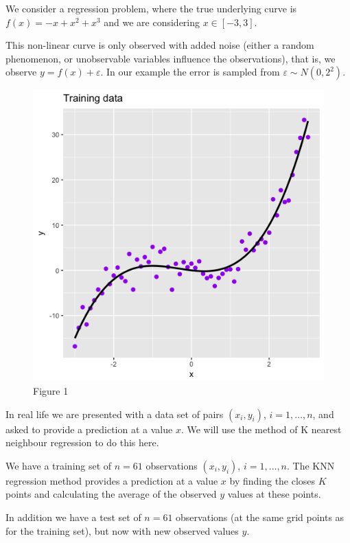 \documentclass[]{article}
\begin{document}
We consider a regression problem, where the true underlying curve is
\(f(x)=-x+x^2+x^3\) and we are considering \(x \in [-3,3]\).

This non-linear curve is only observed with added noise (either a random
phenomenon, or unobservable variables influence the observations), that
is, we observe \(y=f(x)+\varepsilon\). In our example the error is
sampled from \(\varepsilon\sim N(0,2^2)\).

\begin{figure}
\centering
\includegraphics{Prob1f1.png}
\caption{Figure 1}
\end{figure}

In real life we are presented with a data set of pairs \((x_i,y_i)\),
\(i=1,\ldots,n\), and asked to provide a prediction at a value \(x\). We
will use the method of K nearest neighbour regression to do this here.

We have a training set of \(n=61\) observations \((x_i,y_i)\),
\(i=1,\ldots,n\). The KNN regression method provides a prediction at a
value \(x\) by finding the closes \(K\) points and calculating the
average of the observed \(y\) values at these points.

In addition we have a test set of \(n=61\) observations (at the same
grid points as for the training set), but now with new observed values
\(y\).
\end{document}
